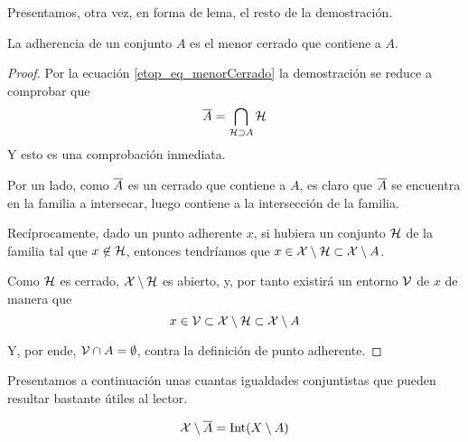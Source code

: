 Presentamos, otra vez, en forma de lema, el resto de la demostración.
\begin{lem}
	\label{etop_lem_caracterizacionAdherencia}
	La adherencia de un conjunto $A$ es el menor cerrado que contiene a $A$.
\end{lem}
\begin{proof}
	Por la ecuación \eqref{etop_eq_menorCerrado} la demostración se reduce a comprobar que
	\begin{equation*}
		\overline{A}=\bigcap_{\mathcal{H}\supset A}\mathcal{H}
	\end{equation*}
	Y esto es una comprobación inmediata.
	
	Por un lado, como $\overline{A}$ es un cerrado que contiene a $A$, es claro que $\overline{A}$ se encuentra en la familia a intersecar, luego contiene a la intersección de la familia.
	
	Recíprocamente, dado un punto adherente $x$, si hubiera un conjunto $\mathcal{H}$ de la familia tal que $x\not\in \mathcal{H}$, entonces tendríamos que $x\in\mathcal{X}\setminus\mathcal{H}\subset\mathcal{X}\setminus A$.
	
	Como $\mathcal{H}$ es cerrado, $\mathcal{X}\setminus\mathcal{H}$ es abierto, y, por tanto existirá un entorno $\mathcal{V}$ de $x$ de manera que \begin{equation*}
		x\in\mathcal{V}\subset\mathcal{X}\setminus\mathcal{H}\subset\mathcal{X}\setminus A
	\end{equation*}
	
	Y, por ende, $\mathcal{V}\cap A=\emptyset$, contra la definición de punto adherente.
\end{proof}
Presentamos a continuación unas cuantas igualdades conjuntistas que pueden resultar bastante útiles al lector.
\begin{prop}
	\label{etop_prop_compAdher}
	\begin{equation*}
		\mathcal{X}\setminus\overline{A}=\operatorname{\mathrm{Int}}(X\setminus A)
	\end{equation*}
\end{prop}
